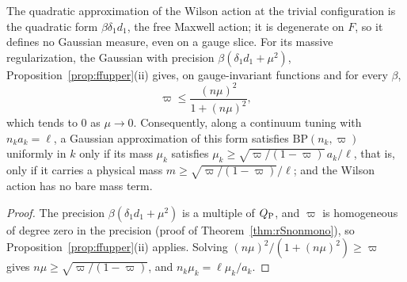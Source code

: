 \begin{proposition}
\label{prop:rSquadratic}
The quadratic approximation of the Wilson action at the trivial
configuration is the quadratic form $\beta\delta_1d_1$, the free Maxwell
action; it is degenerate on $F$, so it defines no Gaussian measure, even on a
gauge slice. For its massive regularization, the Gaussian with precision
$\beta(\delta_1d_1+\mu^2)$, Proposition~\ref{prop:ffupper}(ii) gives, on
gauge-invariant functions and for every $\beta$,
\[
\varpi\le\frac{(n\mu)^2}{1+(n\mu)^2},
\]
which tends to $0$ as $\mu\to0$. Consequently, along a continuum tuning with
$n_ka_k=\ell$, a Gaussian approximation of this form satisfies $\mathrm{BP}
(n_k,\varpi)$ uniformly in $k$ only if its mass $\mu_k$ satisfies $\mu_k\ge
\sqrt{\varpi/(1-\varpi)}\,a_k/\ell$, that is, only if it carries a physical
mass $m\ge\sqrt{\varpi/(1-\varpi)}/\ell$; and the Wilson action has no bare
mass term.
\end{proposition}

\begin{proof}
The precision $\beta(\delta_1d_1+\mu^2)$ is a multiple of $Q_{\rm P}$, and
$\varpi$ is homogeneous of degree zero in the precision (proof of
Theorem~\ref{thm:rSnonmono}), so Proposition~\ref{prop:ffupper}(ii) applies.
Solving $(n\mu)^2/(1+(n\mu)^2)\ge\varpi$ gives $n\mu\ge\sqrt{\varpi/(1-
\varpi)}$, and $n_k\mu_k=\ell\mu_k/a_k$.
\end{proof}

